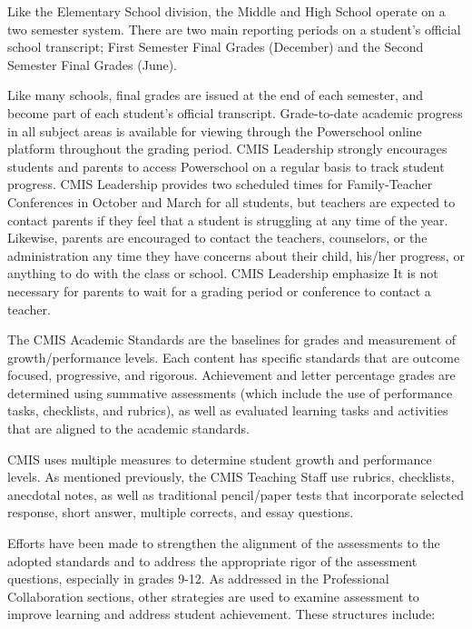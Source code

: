 \begin{findings}

Like the Elementary School division, the Middle and High School operate on a two semester system. There are two main reporting periods on a student’s official school transcript; First Semester Final Grades (December) and the Second Semester Final Grades (June).

Like many schools, final grades are issued at the end of each semester, and become part of each student’s official transcript. Grade-to-date academic progress in all subject areas is available for viewing through the Powerschool online platform throughout the grading period. CMIS Leadership strongly encourages students and parents to access Powerschool on a regular basis to track student progress. CMIS Leadership provides two scheduled times for  Family-Teacher Conferences in October and March for all students, but teachers are expected to contact parents  if they feel that a student is struggling at any time of the year. Likewise, parents are encouraged to contact the teachers, counselors, or the administration any time they have concerns about their child, his/her progress, or anything to do with the class or school. CMIS Leadership emphasize It is not necessary for parents to wait for a grading period or conference to contact a teacher. 

The CMIS Academic Standards are the baselines for grades and measurement of growth/performance levels. Each content has specific standards that are outcome focused, progressive, and rigorous. Achievement and letter percentage grades are determined using summative assessments (which include the use of performance tasks, checklists, and rubrics), as well as evaluated learning tasks and activities that are aligned to the academic standards.

CMIS uses multiple measures to determine student growth and performance levels. As mentioned previously, the CMIS Teaching Staff use rubrics, checklists, anecdotal notes, as well as traditional pencil/paper tests that incorporate selected response, short answer, multiple corrects, and essay questions. 

Efforts have been made to strengthen the alignment of the assessments to the adopted standards and to address the appropriate rigor of the assessment questions, especially in grades 9-12. As addressed in the Professional Collaboration sections, other strategies are used to examine assessment to improve learning and address student achievement. These structures include:


\end{findings}

